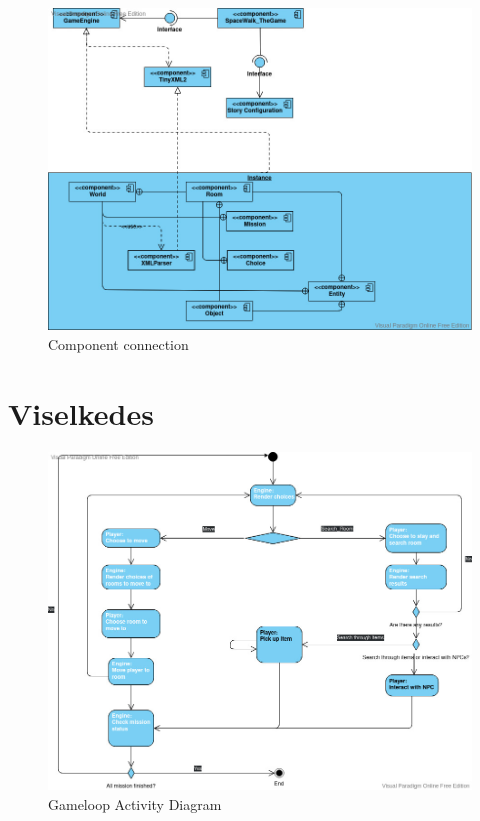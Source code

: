\documentclass{scrarticle}
\begin{document}
\begin{figure}[H]
    \includegraphics[width=1.0\columnwidth]{Component_Connection.jpg}
    \caption{Component connection}\label{fig:3}
\end{figure}

\section{Viselkedes}
\begin{figure}[H]
    \includegraphics[width=1.0\columnwidth]{GameLoop_ActivityDiagram.jpg}
    \caption{Gameloop Activity Diagram}\label{fig:4}
\end{figure}
\end{document}
